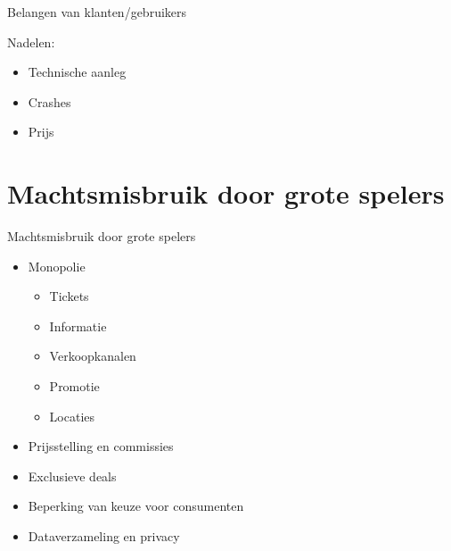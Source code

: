 \documentclass{beamer}
\begin{document}
\begin{frame}{Belangen van klanten/gebruikers}
    \LARGE{
        Nadelen:
        \begin{itemize}
            \item Technische aanleg
            \item Crashes
            \item Prijs
        \end{itemize}
    }
\end{frame}


\section[Machtsmisbruik]{Machtsmisbruik door grote spelers}
\begin{frame}{Machtsmisbruik door grote spelers}
    \begin{itemize}
        \item Monopolie
        \begin{itemize}
            \item Tickets
            \item Informatie
            \item Verkoopkanalen
            \item Promotie
            \item Locaties
        \end{itemize}
        \item Prijsstelling en commissies
        \item Exclusieve deals
        \item Beperking van keuze voor consumenten
        \item Dataverzameling en privacy
    \end{itemize}
\end{frame}
\end{document}
